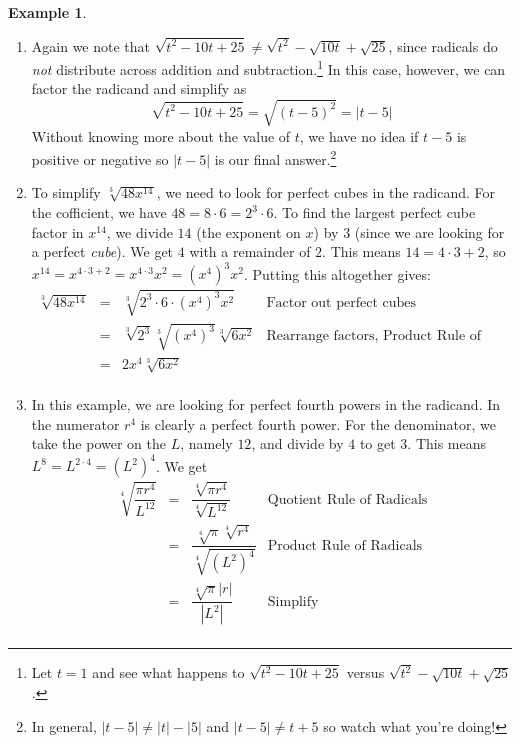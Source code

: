 \documentclass[11pt]{article}
\theoremstyle{definition}  %
\newtheorem{ex}{\bf Example}
\begin{document}
\begin{ex}
\begin{enumerate}
\item Again we note that $\sqrt{t^2-10t+25}  \neq \sqrt{t^2} - \sqrt{10t} + \sqrt{25}$, since radicals do \textit{not} distribute across addition and subtraction.\footnote{Let $t = 1$ and see what happens to $\sqrt{t^2-10t+25}$  versus $\sqrt{t^2} - \sqrt{10t} + \sqrt{25}$.}  In this case, however, we can factor the radicand and simplify as \[ \sqrt{t^2 - 10t + 25} = \sqrt{(t-5)^2} = |t-5| \]
Without knowing more about the value of $t$, we have no idea if $t-5$ is positive or negative so $|t-5|$ is our final answer.\footnote{In general,  $|t-5| \neq |t| - |5|$ and  $|t-5| \neq t + 5$ so watch what you're doing!}

\item  To simplify $\sqrt[3]{48x^{14}}$, we need to look for perfect cubes in the radicand.  For the cofficient, we have $48 = 8 \cdot 6 = 2^3 \cdot 6$.  To find the largest perfect cube factor in $x^{14}$, we divide $14$ (the exponent on $x$) by $3$ (since we are looking for a perfect \textit{cube}).  We get $4$ with a remainder of $2$.  This means $14 = 4 \cdot 3 + 2$, so $x^{14} = x^{4 \cdot 3 + 2} = x^{4 \cdot 3} x^2 = (x^4)^3 x^2$.  Putting this altogether gives:\[\begin{array}{rclr}

\sqrt[3]{48x^{14}} & = & \sqrt[3]{2^3 \cdot 6 \cdot(x^4)^3 x^2} & \text{Factor out perfect cubes} \\ [2pt]
                   & = & \sqrt[3]{2^3} \sqrt[3]{(x^4)^3} \sqrt[3]{6x^2} & \text{Rearrange factors,  Product Rule of Radicals} \\ [2pt]
									 & = & 2x^4\sqrt[3]{6x^2} & \\
\end{array} \]

\item  In this example, we are looking for perfect fourth powers in the radicand.  In the numerator $r^4$ is clearly a perfect fourth power.  For the denominator, we take the power on the $L$, namely $12$, and divide by $4$ to get $3$.  This means $L^{8} = L^{2\cdot 4} = (L^2)^{4}$.  We get \[ \begin{array}{rclr}

\sqrt[4]{\dfrac{\pi r^{4}}{L^{12}}} & = & \dfrac{\sqrt[4]{\pi r^{4}}}{\sqrt[4]{L^{12}}} & \text{Quotient Rule of Radicals} \\ [12pt]

                                    & = & \dfrac{\sqrt[4]{\pi}\sqrt[4]{r^{4}}}{\sqrt[4]{(L^2)^{4}}} & \text{Product Rule of Radicals} \\ [12pt]
																		& = & \dfrac{\sqrt[4]{\pi}|r|}{|L^2|} & \text{Simplify} \\
																	

\end{array}\]
\end{enumerate}
\end{ex}
\end{document}
